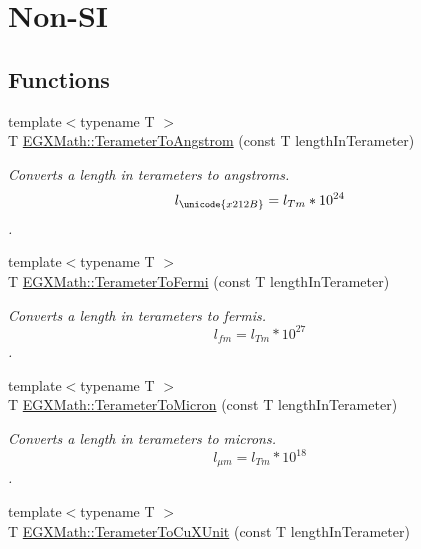 \hypertarget{group___e_g_x_math-_conversions-_length_conversions-_terameter-_non-_s_i}{}\section{Non-\/\+SI}
\label{group___e_g_x_math-_conversions-_length_conversions-_terameter-_non-_s_i}
\subsection*{Functions}
\begin{DoxyCompactItemize}
\item 
{\footnotesize template$<$typename T $>$ }\\T \mbox{\hyperlink{group___e_g_x_math-_conversions-_length_conversions-_terameter-_non-_s_i_gaab75399e224bea4ea7ddb8bf5f557ee0}{E\+G\+X\+Math\+::\+Terameter\+To\+Angstrom}} (const T length\+In\+Terameter)
\begin{DoxyCompactList}\small\item\em Converts a length in terameters to angstroms. \[ l_{\unicode{x212B}}=l_{Tm} * 10^{24} \]. \end{DoxyCompactList}\item 
{\footnotesize template$<$typename T $>$ }\\T \mbox{\hyperlink{group___e_g_x_math-_conversions-_length_conversions-_terameter-_non-_s_i_ga5bf639553e4b6e8520f9345def06e492}{E\+G\+X\+Math\+::\+Terameter\+To\+Fermi}} (const T length\+In\+Terameter)
\begin{DoxyCompactList}\small\item\em Converts a length in terameters to fermis. \[ l_{fm}=l_{Tm} * 10^{27} \]. \end{DoxyCompactList}\item 
{\footnotesize template$<$typename T $>$ }\\T \mbox{\hyperlink{group___e_g_x_math-_conversions-_length_conversions-_terameter-_non-_s_i_gaa5fdc4aaf15e6428cf443e3d808403a3}{E\+G\+X\+Math\+::\+Terameter\+To\+Micron}} (const T length\+In\+Terameter)
\begin{DoxyCompactList}\small\item\em Converts a length in terameters to microns. \[ l_{\mu m}=l_{Tm} * 10^{18} \]. \end{DoxyCompactList}\item 
{\footnotesize template$<$typename T $>$ }\\T \mbox{\hyperlink{group___e_g_x_math-_conversions-_length_conversions-_terameter-_non-_s_i_ga5eab9d29867c570350691cca342c9472}{E\+G\+X\+Math\+::\+Terameter\+To\+Cu\+X\+Unit}} (const T length\+In\+Terameter)

\end{DoxyCompactItemize}
